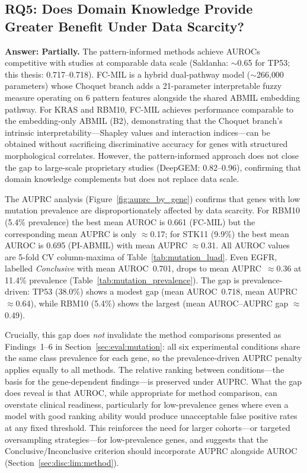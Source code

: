 \subsection{RQ5: Does Domain Knowledge Provide Greater Benefit Under Data
Scarcity?}
\label{sec:eval:rq5}

\textbf{Answer: Partially.}
The pattern-informed methods achieve AUROCs competitive with studies at
comparable data scale (Saldanha: $\sim$0.65 for TP53; this thesis:
0.717--0.718).
FC-MIL is a hybrid dual-pathway model ($\sim$266{,}000
parameters) whose Choquet branch adds a 21-parameter interpretable fuzzy
measure operating on 6 pattern features alongside the shared ABMIL
embedding pathway.
For KRAS and RBM10, FC-MIL achieves performance comparable to the
embedding-only ABMIL (B2), demonstrating that the Choquet branch's
intrinsic interpretability---Shapley values and interaction
indices---can be obtained without sacrificing discriminative accuracy
for genes with structured morphological correlates.
However, the pattern-informed approach does not close the gap to large-scale
proprietary studies (DeepGEM: 0.82--0.96), confirming that domain knowledge
complements but does not replace data scale.

The AUPRC analysis (Figure~\ref{fig:auprc_by_gene}) confirms that
genes with low mutation prevalence are disproportionately affected by
data scarcity. For RBM10 (5.4\% prevalence) the best mean AUROC is
0.661 (FC-MIL) but the corresponding mean AUPRC is only $\approx$0.17;
for STK11 (9.9\%) the best mean AUROC is 0.695 (PI-ABMIL) with mean
AUPRC $\approx$0.31. All AUROC values are 5-fold CV column-maxima of
Table~\ref{tab:mutation_luad}.
Even EGFR, labelled \emph{Conclusive} with mean AUROC~0.701, drops to
mean AUPRC~$\approx$0.36 at 11.4\% prevalence
(Table~\ref{tab:mutation_prevalence}).
The gap is prevalence-driven: TP53 (38.0\%) shows a modest gap
(mean AUROC~0.718, mean AUPRC~$\approx$0.64), while RBM10 (5.4\%)
shows the largest (mean AUROC--AUPRC gap $\approx$0.49).

Crucially, this gap does \emph{not} invalidate the method comparisons
presented as Findings~1--6 in Section~\ref{sec:eval:mutation}: all
six experimental conditions share the same class prevalence for
each gene, so the prevalence-driven AUPRC penalty applies equally
to all methods.
The relative ranking between conditions---the basis for the gene-dependent
findings---is preserved under AUPRC.
What the gap does reveal is that AUROC, while appropriate for method
comparison, can overstate clinical readiness, particularly for
low-prevalence genes where even a model with good ranking ability would
produce unacceptable false positive rates at any fixed threshold.
This reinforces the need for larger cohorts---or targeted oversampling
strategies---for low-prevalence genes, and suggests that the
Conclusive/Inconclusive criterion should incorporate AUPRC alongside
AUROC (Section~\ref{sec:disc:lim:method}).

